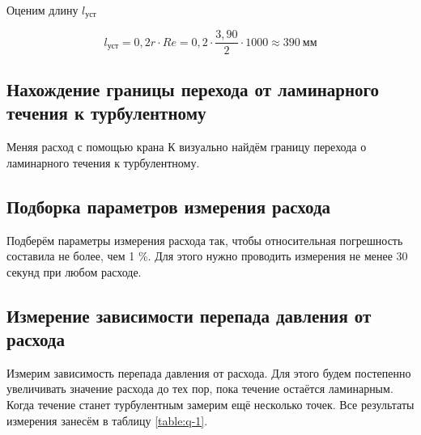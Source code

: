 \documentclass[a4paper,12pt]{article}
\begin{document}
Оценим длину $l_\text{уст}$

\begin{equation*}
    l_\text{уст} = 0,2 r \cdot Re = 0,2 \cdot \frac{3,90}{2} \cdot 1000 \approx 390 \ \text{мм}
\end{equation*}

\subsection{Нахождение границы перехода от ламинарного течения к турбулентному}

Меняя расход с помощью крана К визуально найдём границу перехода о ламинарного течения к турбулентному.


\subsection{Подборка параметров измерения расхода}

Подберём параметры измерения расхода так, чтобы относительная погрешность составила не более, чем 1 \%. Для этого нужно проводить измерения не менее 30 секунд при любом расходе.

\subsection{Измерение зависимости перепада давления от расхода}

Измерим зависимость перепада давления от расхода. Для этого будем постепенно увеличивать значение расхода до тех пор, пока течение остаётся ламинарным. Когда течение станет турбулентным замерим ещё несколько точек. Все результаты измерения занесём в таблицу \ref{table:q-1}.
\end{document}
